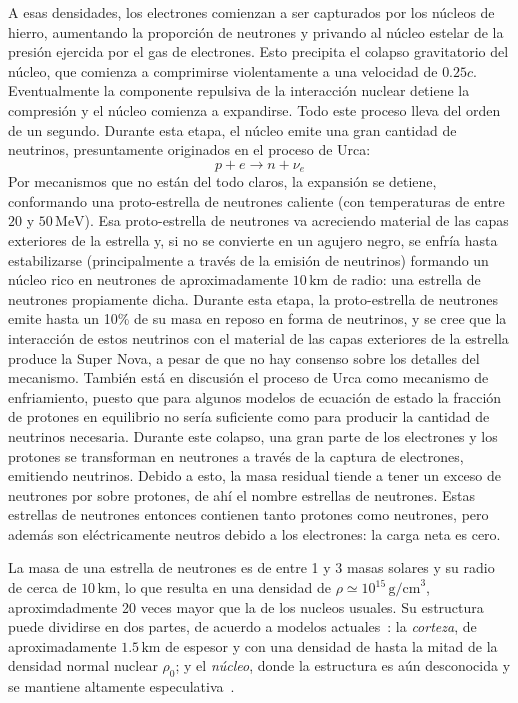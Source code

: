A esas densidades, los electrones comienzan a ser capturados por los núcleos de hierro, aumentando la proporción de neutrones y privando al núcleo estelar de la presión ejercida por el gas de electrones.
Esto precipita el colapso gravitatorio del núcleo, que comienza a comprimirse violentamente a una velocidad de $0.25c$.
Eventualmente la componente repulsiva de la interacción nuclear detiene la compresión y el núcleo comienza a expandirse.
Todo este proceso lleva del orden de un segundo.
Durante esta etapa, el núcleo emite una gran cantidad de neutrinos, presuntamente originados en el proceso de Urca:
\begin{equation}
  p + e\rightarrow n + \nu_e
\end{equation}
Por mecanismos que no están del todo claros, la expansión se detiene, conformando una proto-estrella de neutrones caliente (con temperaturas de entre $20$ y $50\,\text{MeV}$).
Esa proto-estrella de neutrones va acreciendo material de las capas exteriores de la estrella y, si no se convierte en un agujero negro, se enfría hasta estabilizarse (principalmente a través de la emisión de neutrinos) formando un núcleo rico en neutrones de aproximadamente $10\,\text{km}$ de radio: una estrella de neutrones propiamente dicha.
Durante esta etapa, la proto-estrella de neutrones emite hasta un 10\% de su masa en reposo en forma de neutrinos, y se cree que la interacción de estos neutrinos con el material de las capas exteriores de la estrella produce la Super Nova, a pesar de que no hay consenso sobre los detalles del mecanismo.
También está en discusión el proceso de Urca como mecanismo de enfriamiento, puesto que para algunos modelos de ecuación de estado la fracción de protones en equilibrio no sería suficiente como para producir la cantidad de neutrinos necesaria.
Durante este colapso, una gran parte de los electrones y los protones se transforman en neutrones a través de la captura de electrones, emitiendo neutrinos.
Debido a esto, la masa residual tiende a tener un exceso de neutrones por sobre protones, de ahí el nombre estrellas de neutrones.
Estas estrellas de neutrones entonces contienen tanto protones como neutrones, pero además son eléctricamente neutros debido a los electrones: la carga neta es cero.

La masa de una estrella de neutrones es de entre 1 y 3 masas solares y su radio de cerca de $10\,\text{km}$, lo que resulta en una densidad de $\rho \simeq 10^{15}\,\text{g/cm}^3$, aproximdadmente 20 veces mayor que la de los nucleos usuales.
Su estructura puede dividirse en dos partes, de acuerdo a modelos actuales~\cite{page_minimal_2004, geppert_temperature_2004}: la \emph{corteza}, de aproximadamente $1.5\,\text{km}$ de espesor y con una densidad de hasta la mitad de la densidad normal nuclear $\rho_0$; y el \emph{núcleo}, donde la estructura es aún desconocida y se mantiene altamente especulativa~\cite{woosley_physics_2005}.

